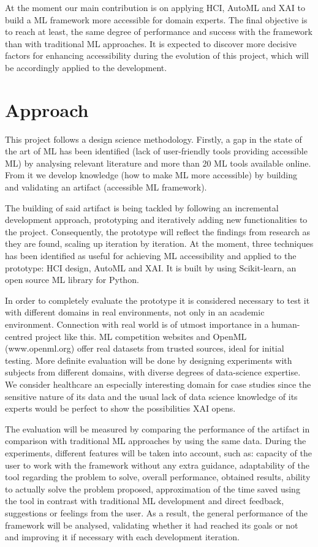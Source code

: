 \documentclass[runningheads]{llncs}
\begin{document}
At the moment our main contribution is on applying HCI, AutoML and XAI to build a ML framework more accessible for domain experts. The final objective is to reach at least, the same degree of performance and success with the framework than with traditional ML approaches. It is expected to discover more decisive factors for enhancing accessibility during the evolution of this project, which will be accordingly applied to the development. 


\section{Approach}

This project follows a design science methodology. Firstly, a gap in the state of the art of ML has been identified (lack of user-friendly tools providing accessible ML) by analysing relevant literature and more than 20 ML tools available online. From it we develop knowledge (how to make ML more accessible) by building and validating an artifact (accessible ML framework).

The building of said artifact is being tackled by following an incremental development approach, prototyping and iteratively adding new functionalities to the project. Consequently, the prototype will reflect the findings from research as they are found, scaling up iteration by iteration. At the moment, three techniques has been identified as useful for achieving ML accessibility and applied to the prototype: HCI design, AutoML and XAI. It is built by using Scikit-learn, an open source ML library for Python.

In order to completely evaluate the prototype it is considered necessary to test it with different domains in real environments, not only in an academic environment. Connection with real world is of utmost importance in a human-centred project like this. ML competition websites and OpenML (www.openml.org) offer real datasets from trusted sources, ideal for initial testing. More definite evaluation will be done by designing experiments with subjects from different domains, with diverse degrees of data-science expertise. We consider healthcare an especially interesting domain for case studies since the sensitive nature of its data and the usual lack of data science knowledge of its experts would be perfect to show the possibilities XAI opens.

The evaluation will be measured by comparing the performance of the artifact in comparison with traditional ML approaches by using the same data.  During the experiments, different features will be taken into account, such as: capacity of the user to work with the framework without any extra guidance, adaptability of the tool regarding the problem to solve, overall performance, obtained results, ability to actually solve the problem proposed, approximation of the time saved using the tool in contrast with traditional ML development and direct feedback, suggestions or feelings from the user. As a result, the general performance of the framework will be analysed, validating whether it had reached its goals or not and improving it if necessary with each development iteration.
\end{document}
